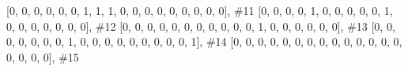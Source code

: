 \documentclass[
  letterpaper,
  DIV=11,
  numbers=noendperiod]{scrreprt}
\newenvironment{Shaded}{\begin{snugshade}}{\end{snugshade}}
\newcommand{\CommentTok}[1]{\textcolor[rgb]{0.37,0.37,0.37}{#1}}
\newcommand{\DecValTok}[1]{\textcolor[rgb]{0.68,0.00,0.00}{#1}}
\newcommand{\NormalTok}[1]{\textcolor[rgb]{0.00,0.23,0.31}{#1}}
\begin{document}
\begin{tcolorbox}
\begin{Shaded}
\begin{Highlighting}[]
\NormalTok{                    [}\DecValTok{0}\NormalTok{, }\DecValTok{0}\NormalTok{, }\DecValTok{0}\NormalTok{, }\DecValTok{0}\NormalTok{, }\DecValTok{0}\NormalTok{, }\DecValTok{0}\NormalTok{, }\DecValTok{1}\NormalTok{, }\DecValTok{1}\NormalTok{, }\DecValTok{1}\NormalTok{, }\DecValTok{0}\NormalTok{, }\DecValTok{0}\NormalTok{, }\DecValTok{0}\NormalTok{, }\DecValTok{0}\NormalTok{, }\DecValTok{0}\NormalTok{, }\DecValTok{0}\NormalTok{, }\DecValTok{0}\NormalTok{, }\DecValTok{0}\NormalTok{, }\DecValTok{0}\NormalTok{], }\CommentTok{\#11}
\NormalTok{                    [}\DecValTok{0}\NormalTok{, }\DecValTok{0}\NormalTok{, }\DecValTok{0}\NormalTok{, }\DecValTok{0}\NormalTok{, }\DecValTok{1}\NormalTok{, }\DecValTok{0}\NormalTok{, }\DecValTok{0}\NormalTok{, }\DecValTok{0}\NormalTok{, }\DecValTok{0}\NormalTok{, }\DecValTok{0}\NormalTok{, }\DecValTok{1}\NormalTok{, }\DecValTok{0}\NormalTok{, }\DecValTok{0}\NormalTok{, }\DecValTok{0}\NormalTok{, }\DecValTok{0}\NormalTok{, }\DecValTok{0}\NormalTok{, }\DecValTok{0}\NormalTok{, }\DecValTok{0}\NormalTok{], }\CommentTok{\#12}
\NormalTok{                    [}\DecValTok{0}\NormalTok{, }\DecValTok{0}\NormalTok{, }\DecValTok{0}\NormalTok{, }\DecValTok{0}\NormalTok{, }\DecValTok{0}\NormalTok{, }\DecValTok{0}\NormalTok{, }\DecValTok{0}\NormalTok{, }\DecValTok{0}\NormalTok{, }\DecValTok{0}\NormalTok{, }\DecValTok{0}\NormalTok{, }\DecValTok{0}\NormalTok{, }\DecValTok{1}\NormalTok{, }\DecValTok{0}\NormalTok{, }\DecValTok{0}\NormalTok{, }\DecValTok{0}\NormalTok{, }\DecValTok{0}\NormalTok{, }\DecValTok{0}\NormalTok{, }\DecValTok{0}\NormalTok{], }\CommentTok{\#13}
\NormalTok{                    [}\DecValTok{0}\NormalTok{, }\DecValTok{0}\NormalTok{, }\DecValTok{0}\NormalTok{, }\DecValTok{0}\NormalTok{, }\DecValTok{0}\NormalTok{, }\DecValTok{0}\NormalTok{, }\DecValTok{0}\NormalTok{, }\DecValTok{1}\NormalTok{, }\DecValTok{0}\NormalTok{, }\DecValTok{0}\NormalTok{, }\DecValTok{0}\NormalTok{, }\DecValTok{0}\NormalTok{, }\DecValTok{0}\NormalTok{, }\DecValTok{0}\NormalTok{, }\DecValTok{0}\NormalTok{, }\DecValTok{0}\NormalTok{, }\DecValTok{0}\NormalTok{, }\DecValTok{1}\NormalTok{], }\CommentTok{\#14}
\NormalTok{                    [}\DecValTok{0}\NormalTok{, }\DecValTok{0}\NormalTok{, }\DecValTok{0}\NormalTok{, }\DecValTok{0}\NormalTok{, }\DecValTok{0}\NormalTok{, }\DecValTok{0}\NormalTok{, }\DecValTok{0}\NormalTok{, }\DecValTok{0}\NormalTok{, }\DecValTok{0}\NormalTok{, }\DecValTok{0}\NormalTok{, }\DecValTok{0}\NormalTok{, }\DecValTok{0}\NormalTok{, }\DecValTok{0}\NormalTok{, }\DecValTok{0}\NormalTok{, }\DecValTok{0}\NormalTok{, }\DecValTok{0}\NormalTok{, }\DecValTok{0}\NormalTok{, }\DecValTok{0}\NormalTok{], }\CommentTok{\#15}

\end{Highlighting}
\end{Shaded}
\end{tcolorbox}
\end{document}
